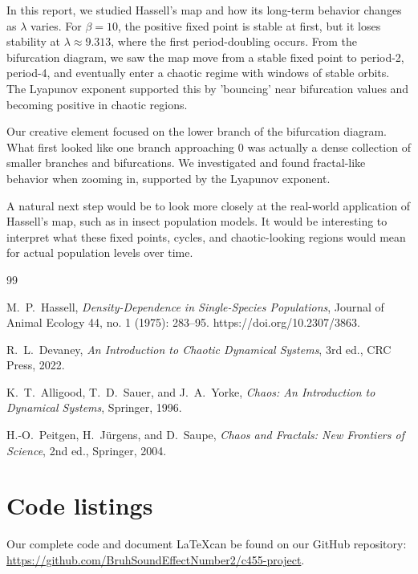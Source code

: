 \documentclass[12pt]{article}
\newcommand{\instr}[1]{{\color{instr}\itshape #1}}
\begin{document}
In this report, we studied Hassell's map and how its long-term behavior changes as $\lambda$ varies. For $\beta=10$, the positive fixed point is stable at first, but it loses stability at $\lambda \approx 9.313$, where the first period-doubling occurs. From the bifurcation diagram, we saw the map move from a stable fixed point to period-2, period-4, and eventually enter a chaotic regime with windows of stable orbits.  The Lyapunov exponent supported this by 'bouncing' near bifurcation values and becoming positive in chaotic regions.

Our creative element focused on the lower branch of the bifurcation diagram. What first looked like one branch approaching $0$ was actually a dense collection of smaller branches and bifurcations. We investigated and found fractal-like behavior when zooming in, supported by the Lyapunov exponent.

A natural next step would be to look more closely at the real-world application of Hassell's map, such as in insect population models. It would be interesting to interpret what these fixed points, cycles, and chaotic-looking regions would mean for actual population levels over time.

\begin{thebibliography}{99}

M.~P.\ Hassell, \emph{Density-Dependence in Single-Species Populations}, Journal of Animal Ecology 44, no. 1 (1975): 283–95. https://doi.org/10.2307/3863.

R.~L.\ Devaney, \emph{An Introduction to Chaotic Dynamical Systems}, 3rd ed.,
CRC Press, 2022.

K.~T.\ Alligood, T.~D.\ Sauer, and J.~A.\ Yorke, \emph{Chaos: An Introduction
to Dynamical Systems}, Springer, 1996.

H.-O.\ Peitgen, H.\ J\"urgens, and D.\ Saupe, \emph{Chaos and Fractals: New
Frontiers of Science}, 2nd ed., Springer, 2004.


\end{thebibliography}

\appendix
\section{Code listings}

Our complete code and document \LaTeX can be found on our GitHub repository: \url{https://github.com/BruhSoundEffectNumber2/c455-project}.
\end{document}
